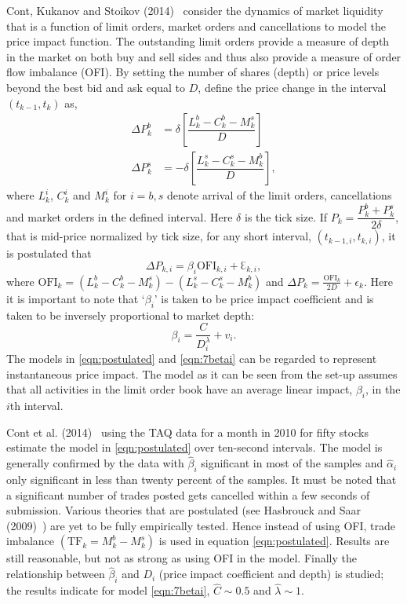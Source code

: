 Cont, Kukanov and Stoikov (2014)~\cite{contkulst} consider the dynamics of market liquidity that is a function of limit orders, market orders and cancellations to model the price impact function. The outstanding limit orders provide a measure of depth in the market on both buy and sell sides and thus also provide a measure of order flow imbalance (OFI). By setting the number of shares (depth) or price levels beyond the best bid and ask equal to $D$, define the price change in the interval $(t_{k-1},t_k)$ as,
	\begin{equation}\label{eqn:doubleeq}
	\begin{aligned}
	\Delta P_k^b&= \delta \left[ \dfrac{L_k^b - C_k^b - M_k^s}{D} \right] \\
	\Delta P_k^s&= -\delta \left[\dfrac{L_k^s-C_k^s-M_k^b}{D}\right],
	\end{aligned}
	\end{equation}
where $L_k^i$, $C_k^i$ and $M_k^i$ for $i=b,s$ denote arrival of the limit orders, cancellations and market orders in the defined interval. Here $\delta$ is the tick size. If $P_k=\dfrac{P_k^b+P_k^s}{2\delta}$, that is mid-price normalized by tick size, for any short interval, $(t_{k-1,i},t_{k,i})$, it is postulated that
	\begin{equation}\label{eqn:postulated}
	\Delta P_{k,i} = \beta_i \text{OFI}_{k,i} + \Eulerconst_{k,i},
	\end{equation}
where $\text{OFI}_k=(L_k^b-C_k^b-M_k^s)-(L_k^s-C_k^s-M_k^b)$ and $\Delta P_k=\frac{\text{OFI}_k}{2D}+\epsilon_k$. Here it is important to note that `$\beta_i$' is taken to be price impact coefficient and is taken to be inversely proportional to market depth:
	\begin{equation} \label{eqn:7betai}
	\beta_i=\dfrac{C}{D_i^\lambda} + v_i.
	\end{equation}
The models in \eqref{eqn:postulated} and \eqref{eqn:7betai} can be regarded to represent instantaneous price impact. The model as it can be seen from the set-up assumes that all activities in the limit order book have an average linear impact, $\beta_i$, in the $i$th interval. 


Cont et al. (2014)~\cite{contkulst} using the TAQ data for a month in 2010 for fifty stocks estimate the model in \eqref{eqn:postulated} over ten-second intervals. The model is generally confirmed by the data with $\hat{\beta}_i$ significant in most of the samples and $\hat{\alpha}_i$ only significant in less than twenty percent of the samples. It must be noted that a significant number of trades posted gets cancelled within a few seconds of submission. Various theories that are postulated (see Hasbrouck and Saar (2009)~\cite{habbrooksaar}) are yet to be fully empirically tested. Hence instead of using OFI, trade imbalance $(\text{TF}_k=M_k^b-M_k^s)$ is used in equation \eqref{eqn:postulated}. Results are still reasonable, but not as strong as using OFI in the model. Finally the relationship between $\hat{\beta}_i$ and $D_i$ (price impact coefficient and depth) is studied; the results indicate for model \eqref{eqn:7betai}, $\hat{C} \sim 0.5$ and $\hat{\lambda} \sim 1$. 


